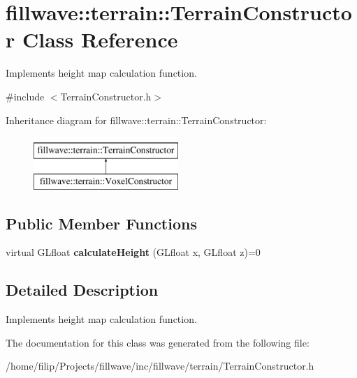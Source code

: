 \hypertarget{classfillwave_1_1terrain_1_1TerrainConstructor}{}\section{fillwave\+:\+:terrain\+:\+:Terrain\+Constructor Class Reference}
\label{classfillwave_1_1terrain_1_1TerrainConstructor}


Implements height map calculation function.  




{\ttfamily \#include $<$Terrain\+Constructor.\+h$>$}

Inheritance diagram for fillwave\+:\+:terrain\+:\+:Terrain\+Constructor\+:\begin{figure}[H]
\begin{center}
\leavevmode
\includegraphics[height=2.000000cm]{classfillwave_1_1terrain_1_1TerrainConstructor}
\end{center}
\end{figure}
\subsection*{Public Member Functions}
\begin{DoxyCompactItemize}
\item 
\hypertarget{classfillwave_1_1terrain_1_1TerrainConstructor_aa6ef372820323f97bcd5b302b54ad537}{}virtual G\+Lfloat {\bfseries calculate\+Height} (G\+Lfloat x, G\+Lfloat z)=0\label{classfillwave_1_1terrain_1_1TerrainConstructor_aa6ef372820323f97bcd5b302b54ad537}

\end{DoxyCompactItemize}


\subsection{Detailed Description}
Implements height map calculation function. 

The documentation for this class was generated from the following file\+:\begin{DoxyCompactItemize}
\item 
/home/filip/\+Projects/fillwave/inc/fillwave/terrain/Terrain\+Constructor.\+h\end{DoxyCompactItemize}
